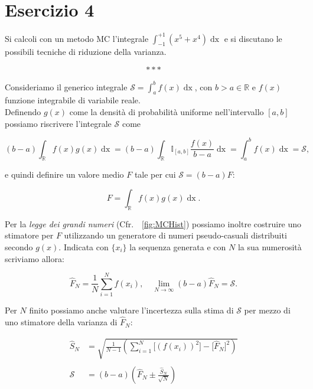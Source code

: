 \section{Esercizio 4}

Si calcoli con un metodo MC l'integrale $ \displaystyle\int_{-1}^{+1}(x^5+x^4)\mathop{dx}$ e si discutano le possibili tecniche di riduzione della varianza.

\bigskip\[* * * \] \smallskip

\noindent Consideriamo il generico integrale $ \displaystyle
\mathcal{S} = \int_a^b f(x) \mathop{dx}$, con $b>a \in \mathbb{R}$ e $f(x)$ funzione integrabile di variabile reale.\\

\noindent Definendo $g(x)$ come la densità di probabilità uniforme nell'intervallo $[a,b]$ possiamo riscrivere l'integrale $\mathcal{S}$ come

\begin{equation*}
(b-a)\int_{\mathbb{R}} f(x) g(x) \mathop{dx} = (b-a)\int_{\mathbb{R}}\mathbb{I}_{[a,b]}\frac{f(x)}{b-a}\mathop{dx} = \int_a^b f(x) \mathop{dx} = \mathcal{S},
\end{equation*}

\noindent e quindi definire un valore medio $F$ tale per cui $\mathcal{S} = (b-a)F$:

\begin{equation*}
F = \int_{\mathbb{R}}f(x)g(x)\mathop{dx}.
\end{equation*}

\noindent Per la \textit{legge dei grandi numeri} (Cfr.~\figurename~\ref{fig:MCHist}) possiamo inoltre costruire uno stimatore per $F$ utilizzando un generatore di numeri pseudo-casuali distribuiti secondo $g(x)$. Indicata con $\{x_i\}$ la sequenza generata e con $N$ la sua numerosità scriviamo allora:

\begin{equation}
\hat{F}_N = \frac{1}{N} \sum_{i=1}^{N}f(x_i),\quad \lim_{N\to\infty} (b-a)\hat{F}_N= \mathcal{S}.
\label{eq:MCstandard}
\end{equation}

\noindent Per $N$ finito possiamo anche valutare l'incertezza sulla stima di $\mathcal{S}$ per mezzo di uno stimatore della varianza di $\hat{F}_N$:

\begin{align}
\hat{S}_N &= \sqrt{\frac{1}{N-1} \left(\sum_{i=1}^{N}\bigl[(f(x_i))^2\bigr] - \bigl[\hat{F}_N\bigr]^2\right)}\\
\nonumber\\
\mathcal{S} &= (b-a)\left(\hat{F}_N \pm \frac{\hat{S}_N}{\sqrt{N}}\right)
\end{align}

